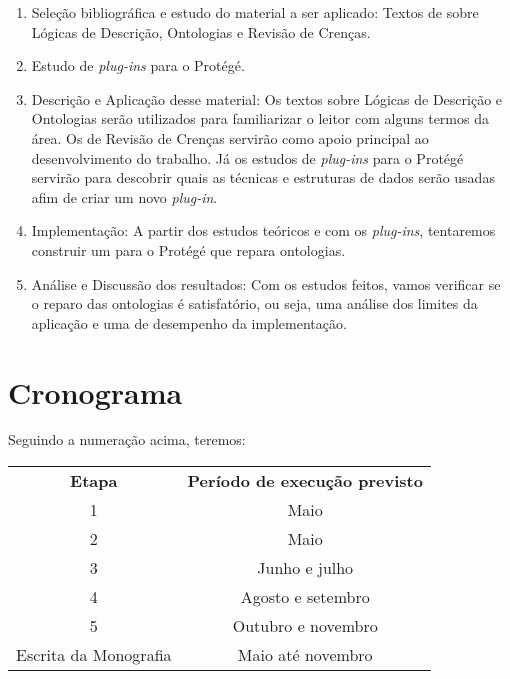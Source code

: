 \documentclass[12pt,letterpaper]{article}
\begin{document}
	\begin{enumerate}
		\item Seleção bibliográfica e estudo do material a ser aplicado: Textos de sobre Lógicas de Descrição, Ontologias e Revisão de Crenças. 
		\item Estudo de \textit{plug-ins} para o Protégé.
		\item Descrição e Aplicação desse material: Os textos sobre Lógicas de Descrição e Ontologias serão utilizados para familiarizar o leitor com alguns termos da área. Os de Revisão de Crenças servirão como apoio principal ao desenvolvimento do trabalho. Já os estudos de \textit{plug-ins} para o Protégé servirão para descobrir quais as técnicas e estruturas de dados serão usadas afim de criar um novo \textit{plug-in}. 
		\item Implementação: A partir dos estudos teóricos e com os \textit{plug-ins}, tentaremos construir um para o Protégé que repara ontologias.
		\item Análise e Discussão dos resultados: Com os estudos feitos, vamos verificar se o reparo das ontologias é satisfatório, ou seja, uma análise dos limites da aplicação e uma de desempenho da implementação.
	\end{enumerate}
	
	\section{Cronograma}

	Seguindo a numeração acima, teremos:
	
	\begin{center}
		\begin{tabular}{|c|c|}
			\cline{1-2}
			\textbf{Etapa} & \textbf{Período de execução previsto}  \\ \cline{1-2}
			1 & Maio \\ \cline{1-2}
			2 & Maio \\ \cline{1-2}
			3 & Junho e julho \\ \cline{1-2}
			4 & Agosto e setembro \\ \cline{1-2}
			5 & Outubro e novembro \\ \cline{1-2}
			Escrita da Monografia & Maio até novembro  \\ \cline{1-2}
		\end{tabular}
	\end{center}
	
	
	
	 
\end{document}
